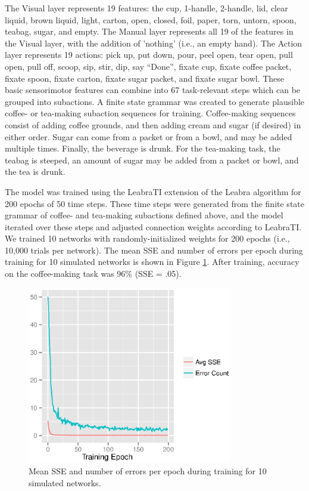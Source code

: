 \documentclass[10pt,letterpaper]{article}
\numberwithin{equation}{section}
\begin{document}
The Visual layer represents 19 features: the cup, 1-handle, 2-handle, lid, clear liquid, brown liquid, light, carton, open, closed, foil, paper, torn, untorn, spoon, teabag, sugar, and empty. The Manual layer represents all 19 of the features in the Visual layer, with the addition of 'nothing' (i.e., an empty hand). The Action layer represents 19 actions: pick up, put down, pour, peel open, tear open, pull open, pull off, scoop, sip, stir, dip, say ``Done'', fixate cup, fixate coffee packet, fixate spoon, fixate carton, fixate sugar packet, and fixate sugar bowl. These basic sensorimotor features can combine into 67 task-relevant steps which can be grouped into subactions. A finite state grammar was created to generate plausible coffee- or tea-making subaction sequences for training. Coffee-making sequences consist of adding coffee grounds, and then adding cream and sugar (if desired) in either order. Sugar can come from a packet or from a bowl, and may be added multiple times. Finally, the beverage is drunk. For the tea-making task, the teabag is steeped, an amount of sugar may be added from a packet or bowl, and the tea is drunk.

The model was trained using the LeabraTI extension of the Leabra algorithm %
for 200 epochs of 50 time steps. These time steps were generated from the finite state grammar of coffee- and tea-making subactions defined above, and the model iterated over these steps and adjusted connection weights according to LeabraTI. We trained 10 networks with randomly-initialized weights for 200 epochs (i.e., 10,000 trials per network). The mean SSE and number of errors per epoch during training for 10 simulated networks is shown in Figure \ref{fig:epochs}.  After training, accuracy on the coffee-making task was 96\% (SSE = .05). 

\begin{figure}
  \centering
  \includegraphics[width=0.8\textwidth]{figs/SSE_and_errors_vs_epoch}
  \caption{Mean SSE and number of errors per epoch during training for 10 simulated networks.}
  \label{fig:epochs}
\end{figure}
\end{document}
